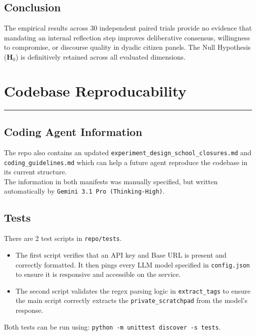 \documentclass[titlepage]{article}
\begin{document}
\subsection{Conclusion}
The empirical results across 30 independent paired trials provide no evidence that mandating an internal reflection step improves deliberative consensus, willingness to compromise, or discourse quality in dyadic citizen panels. The Null Hypothesis ($\boldsymbol{H}_0$) is definitively retained across all evaluated dimensions.

\newpage{}

\section{Codebase Reproducability}
\label{sec:taskdescription}
\rule{\textwidth}{0.4pt}

\subsection{Coding Agent Information}
The repo also contains an updated \texttt{experiment\_design\_school\_closures.md} and \texttt{coding\_guidelines.md} which can help a future agent reproduce the codebase in its current structure.\\

The information in both manifests was manually specified, but written automatically by \texttt{Gemini 3.1 Pro (Thinking-High)}.

\subsection{Tests}
There are 2 test scripts in \texttt{repo/tests}.
\begin{itemize}
    \item The first script verifies that an API key and Base URL is present and correctly formatted. It then pings every LLM model specified in \texttt{config.json} to ensure it is responsive and accessible on the service.
    \item The second script validates the regex parsing logic in \texttt{extract\_tags} to ensure the main script correctly extracts the \texttt{private\_scratchpad} from the model's response.
\end{itemize}

Both tests can be run using: \texttt{python -m unittest discover -s tests}.\\
\end{document}

